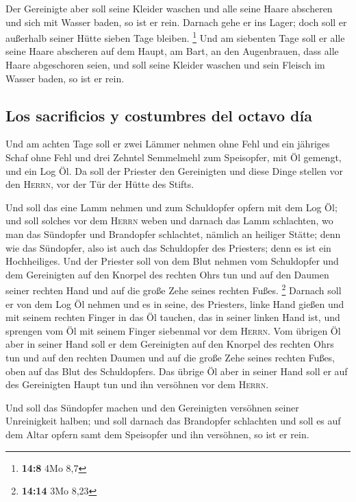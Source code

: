  Der Gereinigte aber soll seine Kleider waschen und alle
seine Haare abscheren und sich mit Wasser baden, so ist er rein. Darnach
gehe er ins Lager; doch soll er außerhalb seiner Hütte sieben Tage
bleiben. \footnote{\textbf{14:8} 4Mo 8,7}  Und am
siebenten Tage soll er alle seine Haare abscheren auf dem Haupt, am
Bart, an den Augenbrauen, dass alle Haare abgeschoren seien, und soll
seine Kleider waschen und sein Fleisch im Wasser baden, so ist er rein.

\hypertarget{los-sacrificios-y-costumbres-del-octavo-duxeda}{%
\subsection{Los sacrificios y costumbres del octavo
día}\label{los-sacrificios-y-costumbres-del-octavo-duxeda}}

 Und am achten Tage soll er zwei Lämmer nehmen ohne Fehl
und ein jähriges Schaf ohne Fehl und drei Zehntel Semmelmehl zum
Speisopfer, mit Öl gemengt, und ein Log Öl.  Da soll der
Priester den Gereinigten und diese Dinge stellen vor den \textsc{Herrn},
vor der Tür der Hütte des Stifts.

 Und soll das eine Lamm nehmen und zum Schuldopfer opfern
mit dem Log Öl; und soll solches vor dem \textsc{Herrn} weben
 und darnach das Lamm schlachten, wo man das Sündopfer
und Brandopfer schlachtet, nämlich an heiliger Stätte; denn wie das
Sündopfer, also ist auch das Schuldopfer des Priesters; denn es ist ein
Hochheiliges.  Und der Priester soll von dem Blut nehmen
vom Schuldopfer und dem Gereinigten auf den Knorpel des rechten Ohrs tun
und auf den Daumen seiner rechten Hand und auf die große Zehe seines
rechten Fußes. \footnote{\textbf{14:14} 3Mo 8,23} 
Darnach soll er von dem Log Öl nehmen und es in seine, des Priesters,
linke Hand gießen  und mit seinem rechten Finger in das
Öl tauchen, das in seiner linken Hand ist, und sprengen vom Öl mit
seinem Finger siebenmal vor dem \textsc{Herrn}.  Vom
übrigen Öl aber in seiner Hand soll er dem Gereinigten auf den Knorpel
des rechten Ohrs tun und auf den rechten Daumen und auf die große Zehe
seines rechten Fußes, oben auf das Blut des Schuldopfers.
 Das übrige Öl aber in seiner Hand soll er auf des
Gereinigten Haupt tun und ihn versöhnen vor dem \textsc{Herrn}.

 Und soll das Sündopfer machen und den Gereinigten
versöhnen seiner Unreinigkeit halben; und soll darnach das Brandopfer
schlachten  und soll es auf dem Altar opfern samt dem
Speisopfer und ihn versöhnen, so ist er rein.

